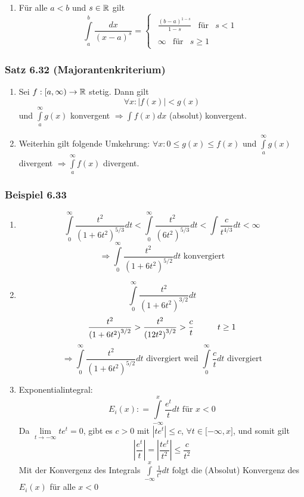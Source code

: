\begin{enumerate}
\begin{enumerate}
\item Für alle $a<b$ und $s\in\mathbb{R}$ gilt \[\int\limits_a^b {\frac{{dx}}{{{{(x - a)}^s}}}}  = \left\{ {\begin{array}{*{20}{c}}
{\begin{array}{*{20}{c}}
{\frac{{{{(b - a)}^{1 - s}}}}{{1 - s}}}&\text{für}&{s < 1}
\end{array}}\\
{\begin{array}{*{20}{c}}
\infty &{{\text{für}}}&{s \ge 1}
\end{array}}
\end{array}} \right.\]
\end{enumerate}
\end{enumerate}
\subsubsection*{Satz 6.32 (Majorantenkriterium)}
\begin{enumerate}[\indent a)]
\item Sei $f:\lbrack a,\infty )\to\mathbb{R}$ stetig. Dann gilt \[\forall x:\left| f(x)\right| <g(x)\] und $\int\limits_a^\infty  {g(x)}$ konvergent $\Rightarrow \int {f(x)dx} $ (absolut) konvergent.
\item Weiterhin gilt folgende Umkehrung: $\forall x:0\leq g(x)\leq f(x)$ und $\int\limits_a^\infty  {g(x)}$ divergent $\Rightarrow \int\limits_a^\infty  {f(x)}$ divergent.
\end{enumerate}

\subsubsection*{Beispiel 6.33}
\begin{enumerate}
\item \[\int\limits_0^\infty  {\frac{{{t^2}}}{{{{\left( {1 + 6{t^2}} \right)}^{5/3}}}}dt}  < \int\limits_0^\infty  {\frac{{{t^2}}}{{{{\left( {6{t^2}} \right)}^{5/3}}}}dt}  < \int {\frac{c}{{{t^{4/3}}}}dt < \infty } \]
\[\Rightarrow\int\limits_0^\infty  {\frac{{{t^2}}}{{{{\left( {1 + 6{t^2}} \right)}^{5/2}}}}dt} \text{ konvergiert}\]
\item \[\int\limits_0^\infty  {\frac{{{t^2}}}{{{{\left( {1 + 6{t^2}} \right)}^{3/2}}}}dt} \]   
\[\frac{{{t^2}}}{{{{\left( {1 + 6{t^2}} \right)}^{3/2}}}} > \frac{{{t^2}}}{{{{\left( {12{t^2}} \right)}^{3/2}}}} > \frac{c}{t}\text{\hspace{10mm}}t\geq 1\]
\[\Rightarrow\int\limits_0^\infty  {\frac{{{t^2}}}{{{{\left( {1 + 6{t^2}} \right)}^{5/2}}}}} dt\text{ divergiert weil }\int\limits_0^\infty  {\frac{c}{t}} dt\text{ divergiert}\]
\item Exponentialintegral:
\[{E_i}(x): = \int\limits_{ - \infty }^x  {\frac{{{e^t}}}{t}dt} \text{ für }x<0\]
Da $\mathop {\lim }\limits_{t \to  - \infty } t{e^t} = 0$, gibt es $c>0$ mit $\left| {t{e^t}} \right| \le c$, $\forall t\in\lbrack -\infty ,x\rbrack$, und somit gilt \[\left| {\frac{{{e^t}}}{t}} \right| = \left| {\frac{{t{e^t}}}{{{t^2}}}} \right| \le \frac{c}{{{t^2}}}\] Mit der Konvergenz des Integrals $\int\limits_{ - \infty }^x {\frac{1}{{{t^2}}}dt} $ folgt die (Absolut) Konvergenz des $E_i(x)$ für alle $x<0$
\end{enumerate}
